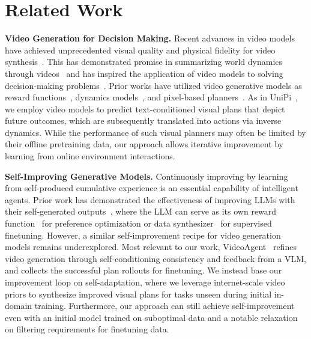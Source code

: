 \section{Related Work}

\textbf{Video Generation for Decision Making.} Recent advances in video models have achieved unprecedented visual quality and physical fidelity for video synthesis~\citep{guo2023animatediff, yang2024cogvideox, videoworldsimulators2024, veo2, wan2025}. This has demonstrated promise in summarizing world dynamics through videos~\citep{yang2024video, Bruce2024GenieGI} and has inspired the application of video models to solving decision-making problems~\citep{alejandro2023viper, du2024learning, yang2023learning, McCarthy2024TowardsGR, liang2024dreamitate}. Prior works have utilized video generative models as reward functions~\citep{luo2024text, alejandro2023viper, huang2023diffusion}, dynamics models~\citep{yang2023learning, Bruce2024GenieGI, Valevski2024DiffusionMA}, and pixel-based planners~\citep{ko2024avdc, ajaj2023hip, du2024video, Zhou2024RoboDreamerLC}. As in UniPi~\citep{du2024video}, we employ video models to predict text-conditioned visual plans that depict future outcomes, which are subsequently translated into actions via inverse dynamics. While the performance of such visual planners may often be limited by their offline pretraining data, our approach allows iterative improvement by learning from online environment interactions.





\textbf{Self-Improving Generative Models.} Continuously improving by learning from self-produced cumulative experience is an essential capability of intelligent agents. Prior work has demonstrated the effectiveness of improving LLMs with their self-generated outputs~\citep{yu-etal-2024-teaching, Tian2024NEURIPS_Toward_Self_Improvement, Huang2022CONFERENCE_Large_Language_Models}, where the LLM can serve as its own reward function~\citep{Yuan2024ICML_Self_Rewarding_Language} for preference optimization or data synthesizer~\citep {Patel2024ARXIV_Large_Language_Models} for supervised finetuning. However, a similar self-improvement recipe for video generation models remains underexplored. Most relevant to our work, VideoAgent~\citep{Soni2024VideoAgentSV} refines video generation through self-conditioning consistency and feedback from a VLM, and collects the successful plan rollouts for finetuning. We instead base our improvement loop on self-adaptation, where we leverage internet-scale video priors to synthesize improved visual plans for tasks unseen during initial in-domain training. Furthermore, our approach can still achieve self-improvement even with an initial model trained on suboptimal data and a notable relaxation on filtering requirements for finetuning data.

